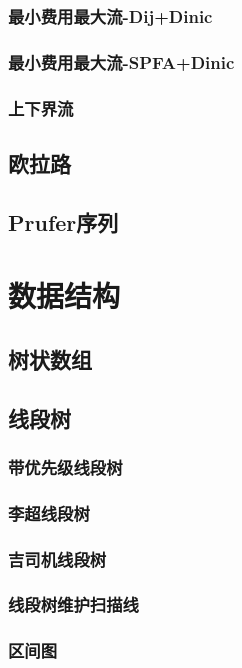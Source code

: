\documentclass[twocolumn,a4]{article}
\newcommand{\addcpp}[1]{}
\begin{document}
		\subsubsection{最小费用最大流-Dij+Dinic} %
			\addcpp{graph/MSMF_dij_dinic}
		\subsubsection{最小费用最大流-SPFA+Dinic}
			\addcpp{graph/MSMF_SPFA_dinic}
		\subsubsection{上下界流}
	\subsection{欧拉路}
		\addcpp{graph/euler_path}
	\subsection{Prufer序列}

\section{数据结构}
	\subsection{树状数组}
	\subsection{线段树}
		\subsubsection{带优先级线段树}
		\subsubsection{李超线段树}
			\addcpp{datastruct/lichao_seg} %
		\subsubsection{吉司机线段树}
			\addcpp{datastruct/minSeg}
		\subsubsection{线段树维护扫描线}
			\addcpp{datastruct/scanline} %
		\subsubsection{区间图}
			\addcpp{datastruct/interval_dij}
\end{document}
